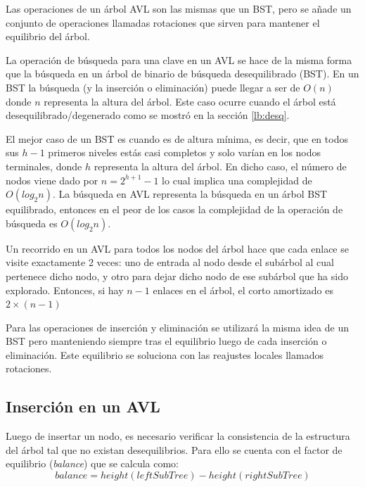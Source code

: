 Las operaciones de un árbol AVL son las mismas que un BST, pero se añade un conjunto de operaciones llamadas rotaciones que sirven para mantener el equilibrio del árbol.

La operación de búsqueda para una clave en un AVL se hace de la misma forma que la búsqueda en un árbol de binario de búsqueda desequilibrado (BST). En un BST la búsqueda (y la inserción o eliminación) puede llegar a ser de $O(n)$ donde $n$ representa la altura del árbol. Este caso ocurre cuando el árbol está desequilibrado/degenerado como se mostró en la sección \ref{lb:desq}.

El mejor caso de un BST es cuando es de altura mínima, es decir, que en todos sus $h-1$ primeros niveles estás casi completos y solo varían en los nodos terminales, donde $h$ representa la altura del árbol. En dicho caso, el número de nodos viene dado por $n = 2^{h+1}-1$ lo cual implica una complejidad de $O(log_2n)$. La búsqueda en AVL representa la búsqueda en un árbol BST equilibrado, entonces en el peor de los casos la complejidad de la operación de búsqueda es $O(log_2n)$.

Un recorrido en un AVL para todos los nodos del árbol hace que cada enlace se visite exactamente 2 veces: uno de entrada al nodo desde el subárbol al cual pertenece dicho nodo, y otro para dejar dicho nodo de ese subárbol que ha sido explorado. Entonces, si hay $n-1$ enlaces en el árbol, el corto amortizado es $2 \times (n-1)$

Para las operaciones de inserción y eliminación se utilizará la misma idea de un BST pero manteniendo siempre tras el equilibrio luego de cada inserción o eliminación. Este equilibrio se soluciona con las reajustes locales llamados rotaciones.

\subsection{Inserción en un AVL}

Luego de insertar un nodo, es necesario verificar la consistencia de la estructura del árbol tal que no existan desequilibrios. Para ello se cuenta con el factor de equilibrio (\textit{balance}) que se calcula como:
$$balance = height(leftSubTree) - height(rightSubTree)$$

